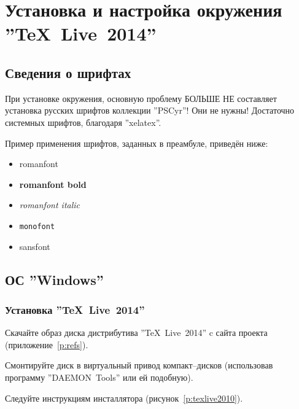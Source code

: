 \section{Установка и настройка окружения ''\TeX~Live~2014''}

\subsection{Сведения о шрифтах}

При установке окружения, основную проблему БОЛЬШЕ НЕ составляет установка русских шрифтов коллекции ''PSCyr''! Они не нужны! Достаточно системных шрифтов, благодаря ''xelatex''.

Пример применения шрифтов, заданных в преамбуле, приведён ниже:
\begin{itemize}
  \item  \textrm{romanfont}
  \item  \textrm{\bf romanfont bold}
  \item  \textrm{\it romanfont italic}
  \item  \texttt{monofont}
  \item  \textsf{sansfont}
\end{itemize}



\subsection{ОС ''Windows''}


\subsubsection{Установка ''\TeX~Live~2014''}

Скачайте образ диска дистрибутива ''\TeX~Live~2014'' c сайта проекта (приложение~\ref{p:refs}).

Смонтируйте диск в виртуальный привод компакт–дисков (использовав программу ''DAEMON~Tools'' или ей подобную).

Следуйте инструкциям инсталлятора (рисунок~\ref{p:texlive2010}).


